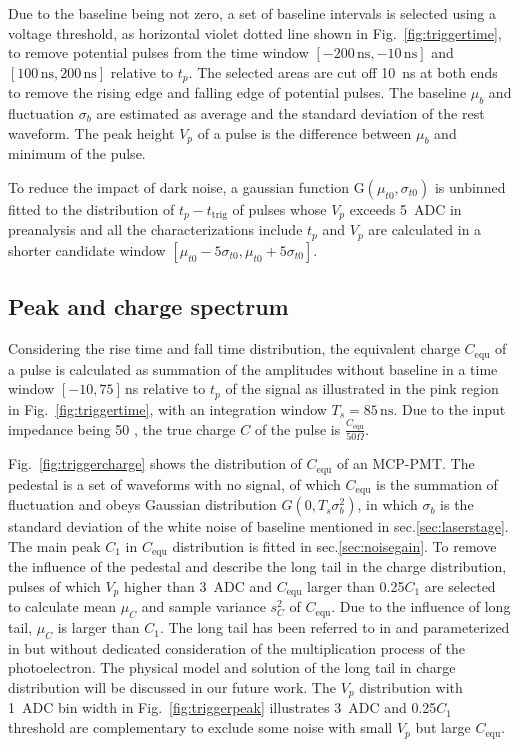Due to the baseline being not zero, a set of baseline intervals is selected using a voltage threshold, as horizontal violet dotted line shown in Fig.~\ref{fig:triggertime}, to remove potential pulses from the time window $[-200\,\mathrm{ns},-10\,\mathrm{ns}]$ and $[100\,\mathrm{ns},200\,\mathrm{ns}]$ relative to $t_p$. The selected areas are cut off \SI{10}{ns} at both ends to remove the rising edge and falling edge of potential pulses. The baseline $\mu_b$ and fluctuation $\sigma_b$ are estimated as average and the standard deviation of the rest waveform. The peak height $V_p$ of a pulse is the difference between $\mu_b$ and minimum of the pulse.

To reduce the impact of dark noise, a gaussian function G$(\mu_{t0},\sigma_{t0})$ is unbinned fitted to the distribution of $t_p-t_{\mathrm{trig}}$ of pulses whose $V_p$ exceeds \SI{5}{ADC} in preanalysis and all the characterizations include $t_p$ and $V_p$ are calculated in a shorter candidate window $[\mu_{t0}-5\sigma_{t0}, \mu_{t0}+5\sigma_{t0}]$.

\subsection{Peak and charge spectrum}
\label{sec:noisepeak}

Considering the rise time and fall time distribution, the equivalent charge $C_{\mathrm{equ}}$ of a pulse is calculated as summation of the amplitudes without baseline in a time window $[-10, 75]$\,ns relative to $t_p$ of the signal as illustrated in the pink region in Fig.~\ref{fig:triggertime}, with an integration window $T_s=85\,\mathrm{ns}$. Due to the input impedance being \SI{50}{\Omega} \cite{CAENV1751}, the true charge $C$ of the pulse is $\frac{C_{\mathrm{equ}}}{50 \Omega}$.

Fig.~\ref{fig:triggercharge} shows the distribution of $C_{\mathrm{equ}}$ of an MCP-PMT. The pedestal is a set of waveforms with no signal, of which $C_{\mathrm{equ}}$ is the summation of fluctuation and obeys Gaussian distribution $G(0, T_s\sigma_b^2)$, in which $\sigma_b$ is the standard deviation of the white noise of baseline mentioned in sec.\ref{sec:laserstage}. The  main peak $C_1$ in $C_{\mathrm{equ}}$ distribution is fitted in sec.\ref{sec:noisegain}. To remove the influence of the pedestal and describe the long tail in the charge distribution, pulses of which $V_p$ higher than \SI{3}{ADC} and $C_{\mathrm{equ}}$ larger than 0.25$C_1$ are selected to calculate mean $\mu_{C}$ and sample variance $s^2_{C}$ of $C_{\mathrm{equ}}$. Due to the influence of long tail, $\mu_{C}$ is larger than $C_1$. The long tail has been referred to in \cite{JUNOMassTesting} and parameterized in \cite{JUNOLongtail} but without dedicated consideration of the multiplication process of the photoelectron. The physical model and solution of the long tail in charge distribution will be discussed in our future work. The $V_p$ distribution with \SI{1}{ADC} bin width in Fig.~\ref{fig:triggerpeak} illustrates \SI{3}{ADC} and 0.25$C_1$ threshold are complementary to exclude some noise with small $V_p$ but large $C_{\mathrm{equ}}$.

